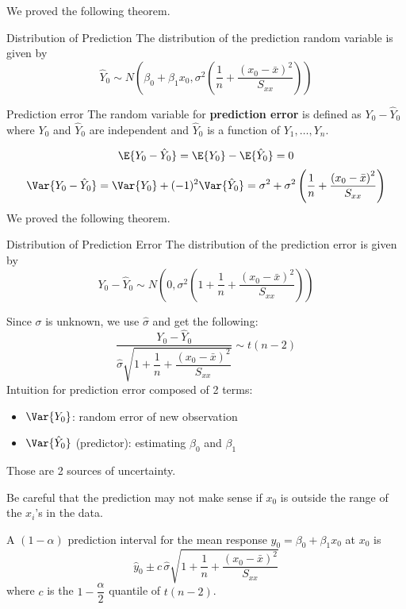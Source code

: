 We proved the following theorem.
\begin{Theorem}{Distribution of Prediction}{}
    The distribution of the prediction random variable is given by
    \[ \hat{Y}_0 \sim N\left( \beta_0+\beta_1x_0,
        \sigma^2\left( \frac{1}{n} +\frac{\left( x_0-\bar{x} \right)^2}{S_{xx}}  \right) \right) \]
\end{Theorem}
\begin{Definition}{Prediction error}{}
    The random variable for \textbf{prediction error} is defined as
    $ Y_0-\hat{Y}_0 $
    where $ Y_0 $ and $ \hat{Y}_0 $ are independent
    and $ \hat{Y}_0 $ is a function of $ Y_1,\ldots,Y_n $.
\end{Definition}
\[ \E{Y_0-\hat{Y}_0}=\E{Y_0}-\E{\hat{Y}_0}=0 \]
\[ \Var{Y_0-\hat{Y}_0}=\Var{Y_0}+(-1)^2\Var{\hat{Y}_0}
    =\sigma^2+\sigma^2\left( \frac{1}{n} +\frac{\left( x_0-\bar{x} \right)^2}{S_{xx}} \right)
\]
We proved the following theorem.
\begin{Theorem}{Distribution of Prediction Error}{}
    The distribution of the prediction error is given by
    \[ Y_0-\hat{Y}_0
        \sim N\left( 0,\sigma^2\left( 1+\frac{1}{n}+\frac{\left( x_0-\bar{x} \right)^2}{S_{xx}}  \right) \right) \]
\end{Theorem}
Since $ \sigma $ is unknown, we use $ \hat{\sigma} $ and get the following:
\[ \frac{Y_0-\hat{Y}_0}{
        \hat{\sigma}\sqrt{1+\dfrac{1}{n}+\dfrac{(x_0-\bar{x})^2}{S_{xx}}}
    } \sim t(n-2) \]
Intuition for prediction error composed of 2 terms:
\begin{itemize}
    \item $ \Var{Y_0} $: random error of new observation
    \item $ \Var{\hat{Y}_0} $ (predictor): estimating $ \beta_0 $ and $ \beta_1 $
\end{itemize}
Those are 2 sources of uncertainty.

\begin{Remark}{}{}
    Be careful that the prediction may not make sense if
    $ x_0 $ is outside the range of the $ x_i $'s in the data.
\end{Remark}

A $ (1-\alpha) $ prediction interval for the mean response $ y_0=\beta_0+\beta_1x_0 $
at $ x_0 $
is
\[ \hat{y}_0\pm c\, \hat{\sigma}\sqrt{1+\dfrac{1}{n}+\dfrac{(x_0-\bar{x})^2}{S_{xx}}}
\]
where $ c $ is the $ 1-\dfrac{\alpha}{2} $ quantile of $ t(n-2) $.
